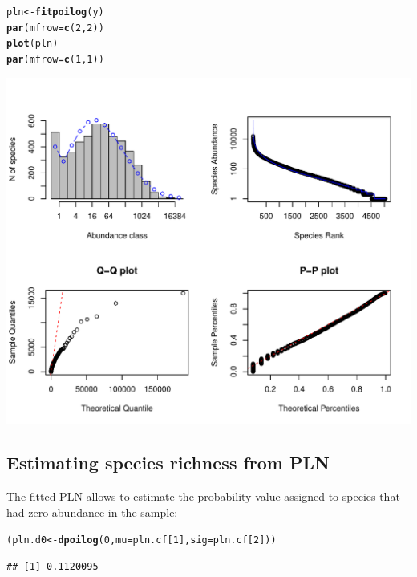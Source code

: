 \documentclass[12pt, A4]{article}\usepackage[]{graphicx}\usepackage[]{color}
\makeatletter
\def\maxwidth{ %
  \ifdim\Gin@nat@width>\linewidth
    \linewidth
  \else
    \Gin@nat@width
  \fi
}
\newcommand{\hlnum}[1]{\textcolor[rgb]{0.686,0.059,0.569}{#1}}%
\newcommand{\hlstd}[1]{\textcolor[rgb]{0.345,0.345,0.345}{#1}}%
\newcommand{\hlkwb}[1]{\textcolor[rgb]{0.69,0.353,0.396}{#1}}%
\newcommand{\hlkwc}[1]{\textcolor[rgb]{0.333,0.667,0.333}{#1}}%
\newcommand{\hlkwd}[1]{\textcolor[rgb]{0.737,0.353,0.396}{\textbf{#1}}}%
\newenvironment{kframe}{%
 \def\at@end@of@kframe{}%
 \ifinner\ifhmode%
  \def\at@end@of@kframe{\end{minipage}}%
  \begin{minipage}{\columnwidth}%
 \fi\fi%
 \def\FrameCommand##1{\hskip\@totalleftmargin \hskip-\fboxsep
 \colorbox{shadecolor}{##1}\hskip-\fboxsep
     \hskip-\linewidth \hskip-\@totalleftmargin \hskip\columnwidth}%
 \MakeFramed {\advance\hsize-\width
   \@totalleftmargin\z@ \linewidth\hsize
   \@setminipage}}%
 {\par\unskip\endMakeFramed%
 \at@end@of@kframe}
\newenvironment{knitrout}{}{} %
\makeatother
\begin{document}
\begin{knitrout}
\color{fgcolor}\begin{kframe}
\begin{alltt}
\hlstd{pln} \hlkwb{<-} \hlkwd{fitpoilog}\hlstd{(y)}
\hlkwd{par}\hlstd{(}\hlkwc{mfrow}\hlstd{=}\hlkwd{c}\hlstd{(}\hlnum{2}\hlstd{,}\hlnum{2}\hlstd{))}
\hlkwd{plot}\hlstd{(pln)}
\hlkwd{par}\hlstd{(}\hlkwc{mfrow}\hlstd{=}\hlkwd{c}\hlstd{(}\hlnum{1}\hlstd{,}\hlnum{1}\hlstd{))}
\end{alltt}
\end{kframe}

{\centering \includegraphics[width=\maxwidth]{figure/fit_pln-1} 

}



\end{knitrout}


\subsection*{Estimating species richness from PLN}

The fitted PLN allows to estimate the probability value assigned to species that
had zero abundance in the sample:

\begin{knitrout}
\color{fgcolor}\begin{kframe}
\begin{alltt}
\hlstd{(pln.d0} \hlkwb{<-} \hlkwd{dpoilog}\hlstd{(}\hlnum{0}\hlstd{,} \hlkwc{mu} \hlstd{= pln.cf[}\hlnum{1}\hlstd{],} \hlkwc{sig}\hlstd{=pln.cf[}\hlnum{2}\hlstd{]))}
\end{alltt}
\begin{verbatim}
## [1] 0.1120095
\end{verbatim}
\end{kframe}
\end{knitrout}
\end{document}
